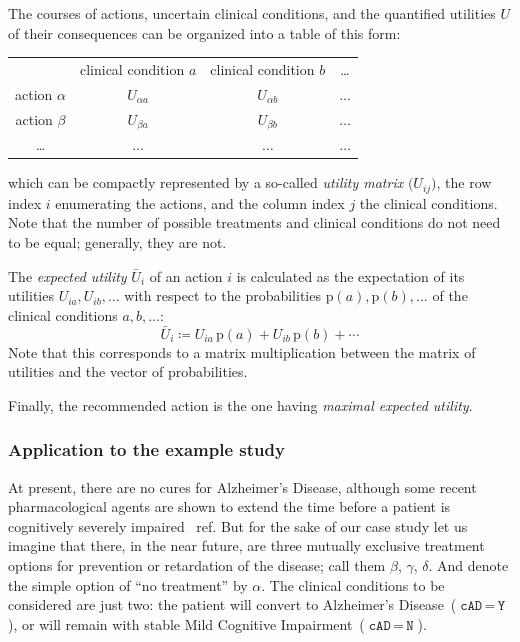 \documentclass[utf8]{FrontiersinHarvard} %
\newcommand*{\wrench}{{\fontencoding{U}\fontfamily{fontawesomethree}\selectfont\symbol{114}}}
\newcommand*{\pencil}{{\fontencoding{U}\fontfamily{fontawesometwo}\selectfont\symbol{210}}}
\newcommand{\mynotew}[1]{{\color{notecolour}\wrench\ #1}}
\newcommand{\mynotep}[1]{{\color{notecolour}\pencil\ #1}}
\newcommand*{\mo}[1][=]{\mathord{\,#1\,}}
\newcommand*{\p}{\mathrm{p}}%
\renewcommand*{\|}[1][]{\nonscript\:#1\vert\nonscript\:\mathopen{}}
\newcommand*{\defd}{\coloneqq}
\newcommand*{\eU}{\bar{U}}
\newcommand*{\cad}{\texttt{cAD}}
\newcommand*{\yes}{\texttt{Y}}
\newcommand*{\no}{\texttt{N}}
\newcommand*{\ad}{Alzheimer's Disease}
\newcommand*{\mci}{Mild Cognitive Impairment}
\begin{document}
The courses of actions, uncertain clinical conditions, and the quantified utilities $U$ of their consequences can be organized into a table of this form:
  \begin{center}
    \begin{tabular}{cccc}
      &{\small clinical condition $a$}&{\small clinical condition $b$}&{\small \ldots}
      \\[2\jot]
      {\small action $\alpha$} & $U_{\alpha a}$ & $U_{\alpha b}$ &$\dotso$ \\[\jot]
      {\small action $\beta$} & $U_{\beta a}$ & $U_{\beta b}$ &$\dotso$ \\[\jot]
      {\small \ldots} &$\dotso$&$\dotso$&$\dotso$
    \end{tabular}
  \end{center}
which can be compactly represented by a so-called \emph{utility matrix} $\bigl(U_{ij})$, the row index $i$ enumerating the actions, and the column index $j$ the clinical conditions. Note that the number of possible treatments and clinical conditions do not need to be equal; generally, they are not.

The \emph{expected utility} $\eU_{i}$ of an action $i$ is calculated as the expectation of its utilities $U_{ia}, U_{ib}, \dotsc$ with respect to the probabilities $\p(a), \p(b), \dotsc$ of the clinical conditions $a,b,\dotsc$:
\begin{equation}
  \label{eq:def_expected_utility}
  \eU_{i} \defd U_{ia}\, \p(a) + U_{ib}\, \p(b) + \dotsb
\end{equation}
Note that this corresponds to a matrix multiplication between the matrix of utilities and the vector of probabilities.

Finally, the recommended action is the one having \emph{maximal expected utility}.




\subsubsection{Application to the example study}
\label{sec:expected_utility_application}

At present, there are no cures for \ad, although some recent pharmacological agents are shown to extend the time before a patient is cognitively severely impaired \mynotew{ref}. But for the sake of our case study let us imagine that there, in the near future, are three mutually exclusive treatment options for prevention or retardation of the disease; call them $\beta$, $\gamma$, $\delta$. And denote the simple option of \enquote{no treatment} by $\alpha$. The clinical conditions to be considered are just two: the patient will convert to \ad\ ($\cad\mo\yes$), or will remain with stable \mci\ ($\cad\mo\no$).
\end{document}
